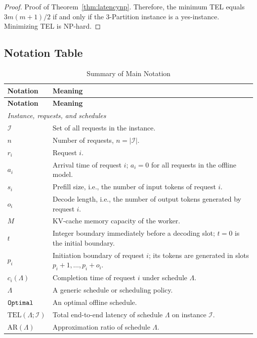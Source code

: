 \documentclass[nonblindrev]{informs3_hide}
\newcommand{\opt}{\texttt{Optimal}}
\begin{document}
\begin{proof}{Proof of Theorem~\ref{thm:latencynp}.}
Therefore, the minimum TEL equals $3m(m+1)/2$ if and only if the 3-Partition instance is a yes-instance. Minimizing TEL is NP-hard.
\Halmos
\end{proof}

\subsection{Notation Table} \label{append:notation}

\begin{longtable}{p{}p{}}
\caption{Summary of Main Notation}\label{tab:notation}\\
\toprule
\textbf{Notation} & \textbf{Meaning} \\
\midrule
\endfirsthead
\toprule
\textbf{Notation} & \textbf{Meaning} \\
\midrule
\endhead

\multicolumn{2}{l}{\textit{Instance, requests, and schedules}}\\
$\mathcal I$ & Set of all requests in the instance. \\
$n$ & Number of requests, $n=|\mathcal I|$. \\
$r_i$ & Request $i$. \\
$a_i$ & Arrival time of request $i$; $a_i=0$ for all requests in the offline model. \\
$s_i$ & Prefill size, i.e., the number of input tokens of request $i$. \\
$o_i$ & Decode length, i.e., the number of output tokens generated by request $i$. \\
$M$ & KV-cache memory capacity of the worker. \\
$t$ & Integer boundary immediately before a decoding slot; $t=0$ is the initial boundary. \\
$p_i$ & Initiation boundary of request $i$; its tokens are generated in slots $p_i+1,\ldots,p_i+o_i$. \\
$c_i(\Lambda)$ & Completion time of request $i$ under schedule $\Lambda$. \\
$\Lambda$ & A generic schedule or scheduling policy. \\
$\textup{\opt}$ & An optimal offline schedule. \\
$\mathrm{TEL}(\Lambda;\mathcal I)$ & Total end-to-end latency of schedule $\Lambda$ on instance $\mathcal I$. \\
$\mathrm{AR}(\Lambda)$ & Approximation ratio of schedule $\Lambda$. \\


\end{longtable}
\end{document}
